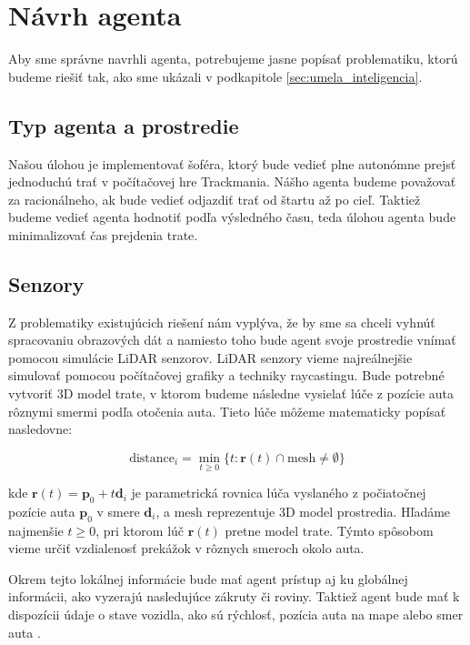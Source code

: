 \section{Návrh agenta}

Aby sme správne navrhli agenta, potrebujeme jasne popísať problematiku, ktorú budeme riešiť tak, ako sme ukázali v podkapitole \ref{sec:umela_inteligencia}.

\subsection{Typ agenta a prostredie}

Našou úlohou je implementovať šoféra, ktorý bude vedieť plne autonómne prejsť jednoduchú trať v počítačovej hre Trackmania. Nášho agenta budeme považovať za racionálneho, ak bude vedieť odjazdiť trať od štartu až po cieľ. Taktiež budeme vedieť agenta hodnotiť podľa výsledného času, teda úlohou agenta bude minimalizovať čas prejdenia trate.

\subsection{Senzory}

Z problematiky existujúcich riešení nám vyplýva, že by sme sa chceli vyhnúť spracovaniu obrazových dát a namiesto toho bude agent svoje prostredie vnímať pomocou simulácie LiDAR senzorov. LiDAR senzory vieme najreálnejšie simulovať pomocou počítačovej grafiky a techniky raycastingu. Bude potrebné vytvoriť 3D model trate, v ktorom budeme následne vysielať lúče z pozície auta rôznymi smermi podľa otočenia auta. Tieto lúče môžeme matematicky popísať nasledovne:

\begin{equation}
\text{distance}_i = \min_{t \geq 0} \{ t : \mathbf{r}(t) \cap \text{mesh} \neq \emptyset \}
\end{equation}

kde $\mathbf{r}(t) = \mathbf{p}_0 + t \mathbf{d}_i$ je parametrická rovnica lúča vyslaného z počiatočnej pozície auta $\mathbf{p}_0$ v smere $\mathbf{d}_i$, a $\text{mesh}$ reprezentuje 3D model prostredia. Hľadáme najmenšie $t \geq 0$, pri ktorom lúč $\mathbf{r}(t)$ pretne model trate. Týmto spôsobom vieme určiť vzdialenosť prekážok v rôznych smeroch okolo auta.

Okrem tejto lokálnej informácie bude mať agent prístup aj ku globálnej informácii, ako vyzerajú nasledujúce zákruty či roviny. Taktiež agent bude mať k dispozícii údaje o stave vozidla, ako sú rýchlosť, pozícia auta na mape alebo smer auta \cite{reinforcment_in_real_time, artificial_intelligence_modern_aproach}.


